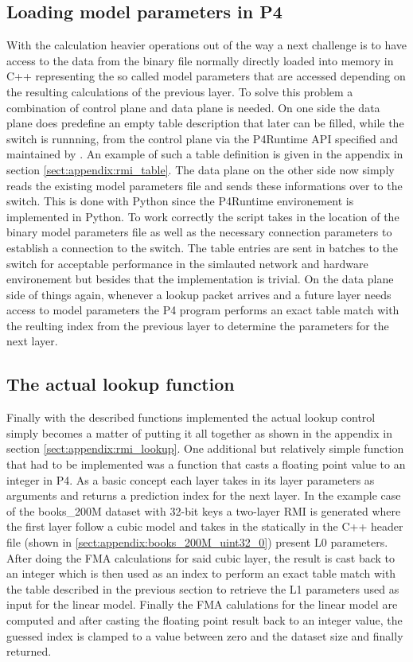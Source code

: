 \subsection{Loading model parameters in P4}
With the calculation heavier operations out of the way a next challenge is to have access to the data from the binary file normally directly loaded into memory in C++ representing the so called model parameters that are accessed depending on the resulting calculations of the previous layer. To solve this problem a combination of control plane and data plane is needed. On one side the data plane does predefine an empty table description that later can be filled, while the switch is runnning, from the control plane via the P4Runtime API specified and maintained by \cite{p4runtime-spec}. An example of such a table definition is given in the appendix in section \ref{sect:appendix:rmi_table}. The data plane on the other side now simply reads the existing model parameters file and sends these informations over to the switch. This is done with Python since the P4Runtime environement is implemented in Python. To work correctly the script takes in the location of the binary model parameters file as well as the necessary connection parameters to establish a connection to the switch. The table entries are sent in batches to the switch for acceptable performance in the simlauted network and hardware environement but besides that the implementation is trivial. On the data plane side of things again, whenever a lookup packet arrives and a future layer needs access to model parameters the P4 program performs an exact table match with the reulting index from the previous layer to determine the parameters for the next layer.

\subsection{The actual lookup function}
Finally with the described functions implemented the actual lookup control simply becomes a matter of putting it all together as shown in the appendix in section \ref{sect:appendix:rmi_lookup}. One additional but relatively simple function that had to be implemented was a function that casts a floating point value to an integer in P4. As a basic concept each layer takes in its layer parameters as arguments and returns a prediction index for the next layer. In the example case of the books\_200M dataset with 32-bit keys a two-layer RMI is generated where the first layer follow a cubic model and takes in the statically in the C++ header file (shown in \ref{sect:appendix:books_200M_uint32_0}) present L0 parameters. After doing the FMA calculations for said cubic layer, the result is cast back to an integer which is then used as an index to perform an exact table match with the table described in the previous section to retrieve the L1 parameters used as input for the linear model. Finally the FMA calulations for the linear model are computed and after casting the floating point result back to an integer value, the guessed index is clamped to a value between zero and the dataset size and finally returned.

